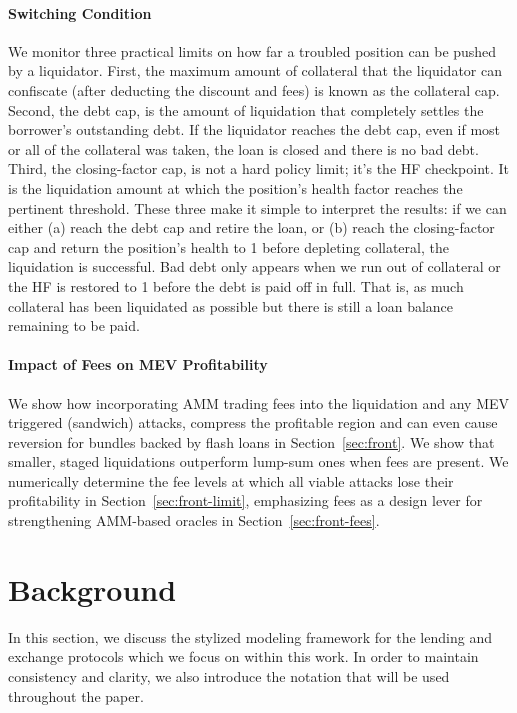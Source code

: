 \documentclass[11pt]{article} %
\begin{document}
\paragraph{Switching Condition} We monitor three practical limits on how far a troubled position can be pushed by a liquidator. First, the maximum amount of collateral that the liquidator can confiscate (after deducting the discount and fees) is known as the collateral cap. Second, the debt cap, is the amount of liquidation that completely settles the borrower's outstanding debt. If the liquidator reaches the debt cap, even if most or all of the collateral was taken, the loan is closed and there is no bad debt. Third, the closing-factor cap, is not a hard policy limit; it’s the HF checkpoint. It is the liquidation amount at which the position's health factor reaches the pertinent threshold. These three make it simple to interpret the results: if we can either (a) reach the debt cap and retire the loan, or (b) reach the closing-factor cap and return the position's health to 1 before depleting collateral, the liquidation is successful. Bad debt only appears when we run out of collateral or the HF is restored to 1 before the debt is paid off in full. That is, as much collateral has been liquidated as possible but there is still a loan balance remaining to be paid.

\paragraph{Impact of Fees on MEV Profitability} We show how incorporating AMM trading fees into the liquidation and any MEV triggered (sandwich) attacks, compress the profitable region and can even cause reversion for bundles backed by flash loans in Section~\ref{sec:front}. We show that smaller, staged liquidations outperform lump-sum ones when fees are present. We numerically determine the fee levels at which all viable attacks lose their profitability in Section~\ref{sec:front-limit}, emphasizing fees as a design lever for strengthening AMM-based oracles in Section~\ref{sec:front-fees}.
\section{Background}\label{sec:background}
In this section, we discuss the stylized modeling framework for the lending and exchange protocols which we focus on within this work. In order to maintain consistency and clarity, we also introduce the notation that will be used throughout the paper.
\end{document}
